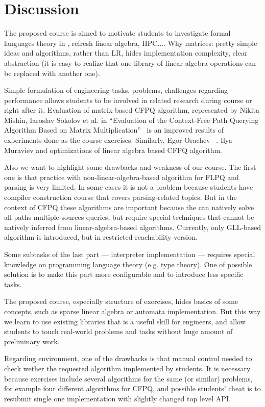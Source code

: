 \documentclass[sigconf]{acmart}
\begin{document}
\section{Discussion}

The proposed course is aimed to motivate students to investigate formal languages theory in , refresh linear algebra, HPC....
Why matrices: pretty simple ideas and algorithms, rather than LR, hides implementation complexity, clear abstraction (it is easy to realize that one library of linear algebra operations can be replaced with another one).

Simple formulation of engineering tasks, problems, challenges regarding performance allows students to be involved in related research during course or right after it. 
Evaluation of matrix-based CFPQ algorithm, represented by Nikita Mishin, Iaroslav Sokolov et al. in ``Evaluation of the Context-Free Path Querying Algorithm Based on Matrix Multiplication''~\cite{10.1145/3327964.3328503} is an improved results of experiments done as the course exercises. 
Similarly, Egor Orachev ~\cite{!!!}. 
Ilya Muraviev and optimizations of linear algebra based CFPQ algorithm.

Also we want to highlight some drawbacks and weakness of our course.
The first one is that practice with non-linear-algebra-based algorithm for FLPQ and parsing is very limited. 
In some cases it is not a problem because students have compiler construction course that covers parsing-related topics.
But in the context of CFPQ these algorithms are important because the can natively solve all-paths multiple-sources queries, but require special techniques that cannot be natively inferred from linear-algebra-based algorithms.
Currently, only GLL-based algorithm is introduced, but in restricted reachability version.

Some subtasks of the last part --- interpreter implementation --- requires special knowledge on programming language theory (e.g. type theory).
One of possible solution is to make this part more configurable and to introduce less specific tasks.

The proposed course, especially structure of exercises, hides basics of some concepts, such as sparse linear algebra or automata implementation.
But this way we learn to use existing libraries that is a useful skill for engineers, and allow students to touch real-world problems and tasks without huge amount of preliminary work.

Regarding environment, one of the drawbacks is that manual control needed to check wether the requested algorithm implemented by students.
It is necessary because exercises include several algorithms for the same (or similar) problems, for example four different algorithms for CFPQ, and possible students' cheat is to resubmit single one implementation with slightly changed top level API.
\end{document}
